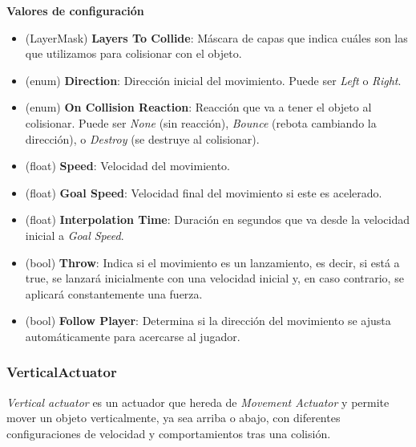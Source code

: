 \textbf{Valores de configuración}
\begin{itemize}
	\item (LayerMask) \textbf{Layers To Collide}: Máscara de capas que indica cuáles son las que utilizamos para colisionar con el objeto.
	\item (enum) \textbf{Direction}: Dirección inicial del movimiento. Puede ser \textit{Left} o \textit{Right}.
	\item (enum) \textbf{On Collision Reaction}: Reacción que va a tener el objeto al colisionar. Puede ser \textit{None} (sin reacción), \textit{Bounce} (rebota cambiando la dirección), o \textit{Destroy} (se destruye al colisionar).
	\item (float) \textbf{Speed}: Velocidad del movimiento.
	\item (float) \textbf{Goal Speed}: Velocidad final del movimiento si este es acelerado.
	\item (float) \textbf{Interpolation Time}: Duración en segundos que va desde la velocidad inicial a \textit{Goal Speed}.
	\item (bool) \textbf{Throw}: Indica si el movimiento es un lanzamiento, es decir, si está a true, se lanzará inicialmente con una velocidad inicial y, en caso contrario, se aplicará constantemente una fuerza.
	\item (bool) \textbf{Follow Player}: Determina si la dirección del movimiento se ajusta automáticamente para acercarse al jugador.
\end{itemize}

\subsubsection{VerticalActuator}
\textit{Vertical actuator} es un actuador que hereda de \textit{Movement Actuator} y permite mover un objeto verticalmente, ya sea arriba o abajo, con diferentes configuraciones de velocidad y comportamientos tras una colisión.\\

